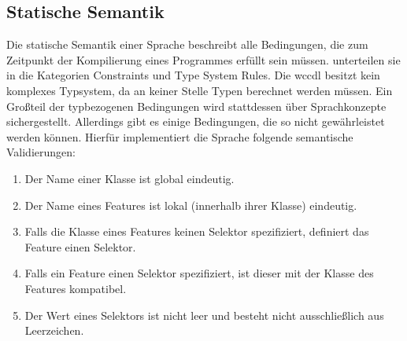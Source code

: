 \subsection{Statische Semantik}
    \label{section:solutionDetailsDslStaticSemantics}
    Die statische Semantik einer Sprache beschreibt alle Bedingungen,
    die zum Zeitpunkt der Kompilierung eines Programmes erfüllt sein müssen.
    \citet[Kapitel 4.3]{voelter:DslEngineering} unterteilen sie in die Kategorien
    Constraints und Type System Rules.
    Die \gls{wccdl} besitzt kein komplexes Typsystem,
    da an keiner Stelle Typen berechnet werden müssen.
    Ein Großteil der typbezogenen Bedingungen wird stattdessen über
    Sprachkonzepte
    sichergestellt.
    Allerdings gibt es einige Bedingungen, die so nicht gewährleistet werden können.
    Hierfür implementiert die Sprache folgende semantische Validierungen:

    \begin{enumerate}
        \item Der Name einer Klasse ist global eindeutig.
        \item Der Name eines Features ist lokal (innerhalb ihrer Klasse) eindeutig.
        \item   Falls die Klasse eines Features keinen Selektor spezifiziert,
                definiert das Feature einen Selektor.
        \item   Falls ein Feature einen Selektor spezifiziert,
                ist dieser mit der Klasse des Features kompatibel.
        \item Der Wert eines Selektors ist nicht leer und besteht nicht ausschließlich aus Leerzeichen.
    \end{enumerate}
